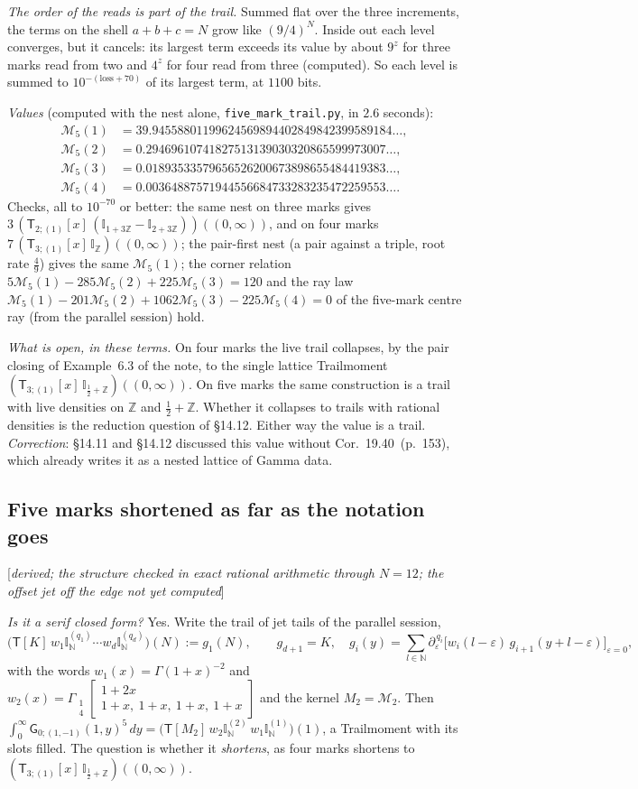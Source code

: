\documentclass[11pt]{article}
\newcommand{\sG}{\mathsf G}
\newcommand{\sT}{\mathsf T}
\newcommand{\Gst}[4]{\Gamma_{\substack{#1\\#2}}\!\begin{bmatrix}#3\\#4\end{bmatrix}}
\newcommand{\IZ}{\mathbb I_{\mathbb Z}}
\newcommand{\Ilat}[1]{\mathbb I_{#1}}
\newcommand{\Tx}[3]{(\sT_{#1;(1)}[x]\,#2)((#3,\infty))}
\newcommand{\status}[1]{\hfill{\small[\textit{#1}]}}
\newcommand{\hb}[2]{#1~(p.~#2)}   %
\theoremstyle{plain}
\theoremstyle{remark}
\begin{document}
\emph{The order of the reads is part of the trail.} Summed flat over the three increments, the terms on the shell $a+b+c=N$ grow like $(9/4)^N$. Inside out each level converges, but it cancels: its largest term exceeds its value by about $9^z$ for three marks read from two and $4^z$ for four read from three (computed). So each level is summed to $10^{-(\text{loss}+70)}$ of its largest term, at $1100$ bits.

\emph{Values} (computed with the nest alone, \texttt{five\_mark\_trail.py}, in $2.6$ seconds):
\begin{align*}
\mathcal M_5(1)&=39.94558801199624569894402849842399589184\ldots,\\
\mathcal M_5(2)&=0.29469610741827513139030320865599973007\ldots,\\
\mathcal M_5(3)&=0.01893533579656526200673898655484419383\ldots,\\
\mathcal M_5(4)&=0.00364887571944556684733283235472259553\ldots.
\end{align*}
Checks, all to $10^{-70}$ or better: the same nest on three marks gives $3\,\Tx{2}{(\Ilat{1+3\mathbb Z}-\Ilat{2+3\mathbb Z})}{0}$, and on four marks $7\,\Tx3\IZ0$; the pair-first nest (a pair against a triple, root rate $\frac49$) gives the same $\mathcal M_5(1)$; the corner relation $5\mathcal M_5(1)-285\mathcal M_5(2)+225\mathcal M_5(3)=120$ and the ray law $\mathcal M_5(1)-201\mathcal M_5(2)+1062\mathcal M_5(3)-225\mathcal M_5(4)=0$ of the five-mark centre ray (from the parallel session) hold.

\emph{What is open, in these terms.} On four marks the live trail collapses, by the pair closing of Example~6.3 of the note, to the single lattice Trailmoment $\Tx{3}{\Ilat{\frac12+\mathbb Z}}{0}$. On five marks the same construction is a trail with live densities on $\mathbb Z$ and $\frac12+\mathbb Z$. Whether it collapses to trails with rational densities is the reduction question of \S14.12. Either way the value is a trail. \emph{Correction}: \S14.11 and \S14.12 discussed this value without Cor.~\hb{19.40}{153}, which already writes it as a nested lattice of Gamma data.

\subsection{Five marks shortened as far as the notation goes}\status{derived; the structure checked in exact rational arithmetic through $N=12$; the offset jet off the edge not yet computed}

\emph{Is it a serif closed form?} Yes. Write the trail of jet tails of the parallel session,
\[
\big(\sT[K]\,w_1\mathbb I^{(q_1)}_{\mathbb N}\cdots w_d\mathbb I^{(q_d)}_{\mathbb N}\big)(N):=g_1(N),\qquad g_{d+1}=K,\quad g_i(y)=\sum_{l\in\mathbb N}\partial_\varepsilon^{\,q_i}\big[w_i(l-\varepsilon)\,g_{i+1}(y+l-\varepsilon)\big]_{\varepsilon=0},
\]
with the words $w_1(x)=\Gamma(1+x)^{-2}$ and $w_2(x)=\Gst14{1+2x}{1+x,\ 1+x,\ 1+x,\ 1+x}$ and the kernel $M_2=\mathcal M_2$. Then $\int_0^\infty\sG_{0;(1,-1)}(1,y)^5\,dy=\big(\sT[M_2]\,w_2\mathbb I^{(2)}_{\mathbb N}\,w_1\mathbb I^{(1)}_{\mathbb N}\big)(1)$, a Trailmoment with its slots filled. The question is whether it \emph{shortens}, as four marks shortens to $\Tx3{\Ilat{\frac12+\mathbb Z}}0$.
\end{document}
